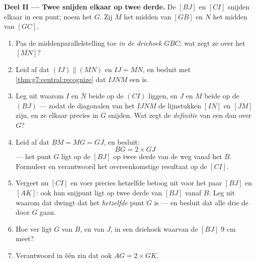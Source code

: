 \begin{problem}
\medskip
\noindent\textbf{Deel II --- Twee  snijden elkaar op twee derde.}
De  $[BJ]$ en $[CI]$ snijden elkaar in een punt; noem het $G$. Zij
$M$ het midden van $[GB]$ en $N$ het midden van $[GC]$.
\begin{enumerate}[resume]
  \item Pas de middenparallelstelling toe \emph{in de driehoek $GBC$}: wat zegt
        ze over het  $[MN]$?
  \item Leid af dat $(IJ) \parallel (MN)$ en $IJ = MN$, en besluit met
        \cref{thm:g7:central:recognize} dat $IJNM$ een  is.
  \item Leg uit waarom $I$ en $N$ beide op de  $(CI)$ liggen, en $J$
        en $M$ beide op de  $(BJ)$ --- zodat de diagonalen van het
         $IJNM$ de lijnstukken $[IN]$ en $[JM]$ zijn, en ze elkaar
        precies in $G$ snijden. Wat zegt de \emph{definitie} van een
         dan over $G$?
  \item Leid af dat $BM = MG = GJ$, en besluit:
        \[
        BG = 2 \times GJ
        \]
        --- het punt $G$ ligt op de  $[BJ]$ op twee derde van de weg
        vanaf het  $B$. Formuleer en verantwoord het overeenkomstige
        resultaat op de  $[CI]$.
  \item Vergeet nu $[CI]$ en voer precies hetzelfde betoog uit voor het paar
         $[BJ]$ en $[AK]$: ook hun snijpunt ligt op twee derde van
        $[BJ]$ vanaf $B$. Leg uit waarom dat dwingt dat het \emph{hetzelfde} punt
        $G$ is --- en besluit dat alle drie de  door $G$ gaan.
  \item Hoe ver ligt $G$ van $B$, en van $J$, in een driehoek waarvan de
         $[BJ]$ $9$ cm meet?
  \item Verantwoord in één zin dat ook $AG = 2 \times GK$.
\end{enumerate}


\end{problem}

